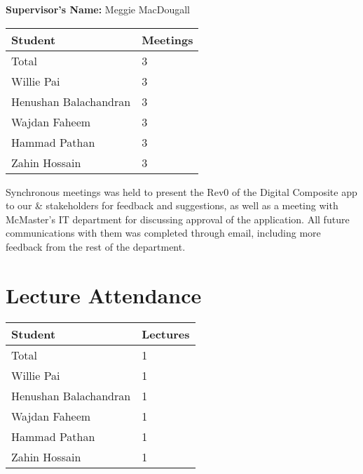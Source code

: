 \documentclass{article}
\begin{document}
\noindent \textbf{Supervisor's Name: } Meggie MacDougall

\begin{table}[H]
\centering
\begin{tabular}{ll}
\toprule
\textbf{Student} & \textbf{Meetings}\\
\midrule
Total & 3\\
Willie Pai & 3\\
Henushan Balachandran & 3\\
Wajdan Faheem & 3\\
Hammad Pathan & 3\\
Zahin Hossain & 3\\
\bottomrule
\end{tabular}
\end{table}


Synchronous meetings was held to present the Rev0 of the Digital Composite app to our \& stakeholders for feedback and suggestions, as well as a meeting with McMaster's IT department for discussing approval of the application. All future communications with them was completed through email, including more feedback from the rest of the department.

\section{Lecture Attendance}


\begin{table}[H]
\centering
\begin{tabular}{ll}
\toprule
\textbf{Student} & \textbf{Lectures}\\
\midrule
Total & 1\\
Willie Pai & 1\\
Henushan Balachandran & 1\\
Wajdan Faheem & 1\\
Hammad Pathan & 1\\
Zahin Hossain & 1\\
\bottomrule
\end{tabular}
\end{table}
\end{document}
